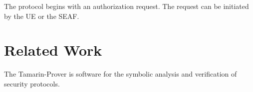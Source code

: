 \documentclass[11pt, pdftex]{article}
\begin{document}
The protocol begins with an authorization request.  The request can be initiated by the UE or the SEAF.  


















\section{Related Work}
The Tamarin-Prover is software for the symbolic analysis and verification of security protocols.



     
\nocite{*}


\end{document}
